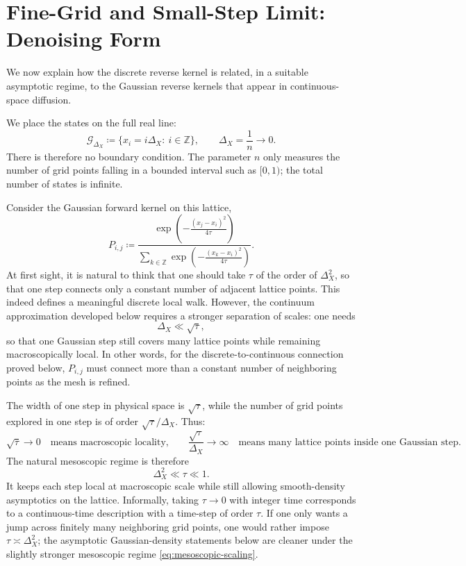 \documentclass[11pt]{article}
\begin{document}
\section{Fine-Grid and Small-Step Limit: Denoising Form}

We now explain how the discrete reverse kernel is related, in a suitable asymptotic regime, to the Gaussian reverse kernels that appear in continuous-space diffusion.

We place the states on the full real line:
\[
\mathcal G_{\Delta_X}\coloneqq \{x_i=i\Delta_X:\ i\in\mathbb Z\},
\qquad
\Delta_X=\frac1n\to 0.
\]
There is therefore no boundary condition. The parameter $n$ only measures the number of grid points falling in a bounded interval such as $[0,1)$; the total number of states is infinite.

Consider the Gaussian forward kernel on this lattice,
\begin{equation}
\label{eq:forward-gaussian-lattice}
P_{i,j}
\coloneqq
\frac{\exp\!\left(-\frac{(x_j-x_i)^2}{4\tau}\right)}
{\sum_{k\in\mathbb Z}\exp\!\left(-\frac{(x_k-x_i)^2}{4\tau}\right)}.
\end{equation}
At first sight, it is natural to think that one should take $\tau$ of the order of $\Delta_X^2$, so that one step connects only a constant number of adjacent lattice points. This indeed defines a meaningful discrete local walk. However, the continuum approximation developed below requires a stronger separation of scales: one needs
\[
\Delta_X\ll \sqrt{\tau},
\]
so that one Gaussian step still covers many lattice points while remaining macroscopically local. In other words, for the discrete-to-continuous connection proved below, $P_{i,j}$ must connect more than a constant number of neighboring points as the mesh is refined.

The width of one step in physical space is $\sqrt{\tau}$, while the number of grid points explored in one step is of order $\sqrt{\tau}/\Delta_X$. Thus:
\[
\sqrt{\tau}\to0
\quad\text{means macroscopic locality,}
\qquad
\frac{\sqrt{\tau}}{\Delta_X}\to\infty
\quad\text{means many lattice points inside one Gaussian step.}
\]
The natural mesoscopic regime is therefore
\begin{equation}
\label{eq:mesoscopic-scaling}
\Delta_X^2\ll \tau\ll 1.
\end{equation}
It keeps each step local at macroscopic scale while still allowing smooth-density asymptotics on the lattice. Informally, taking $\tau\to0$ with integer time corresponds to a continuous-time description with a time-step of order $\tau$.
If one only wants a jump across finitely many neighboring grid points, one would rather impose $\tau\asymp \Delta_X^2$; the asymptotic Gaussian-density statements below are cleaner under the slightly stronger mesoscopic regime \eqref{eq:mesoscopic-scaling}.
\end{document}
